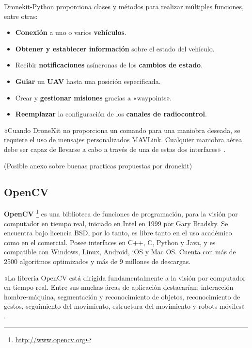 Dronekit-Python proporciona clases y métodos para realizar múltiples funciones, entre otras:
\begin{itemize}
\item \textbf{Conexión} a uno o varios \textbf{vehículos}.
\item \textbf{Obtener y establecer información} sobre el estado del vehículo.
\item Recibir \textbf{notificaciones} asíncronas de los \textbf{cambios de estado}.
\item \textbf{Guiar} un \textbf{\acs{UAV}} hasta una posición especificada.
\item Crear y \textbf{gestionar misiones} gracias a «waypoints».
\item \textbf{Reemplazar} la configuración de los \textbf{canales de radiocontrol}.
\end{itemize}

«Cuando DroneKit no proporciona un comando para una maniobra deseada, se requiere el uso de mensajes personalizados MAVLink.
Cualquier maniobra aérea debe ser capaz de llevarse a cabo a través de una de estas dos interfaces» \cite{dronekit}. 

(Posible anexo sobre buenas practicas propuestas por dronekit)

\subsection{OpenCV}
\label{sec:opencv}

\textbf{OpenCV} \footnote{\url{http://www.opencv.org}} es una biblioteca de funciones de programación, para la visión por computador 
en tiempo real, iniciado en Intel en 1999 por Gary Bradsky. Se encuentra bajo licencia BSD, por lo tanto, es libre tanto en el uso
académico como en el comercial. Posee interfaces en C++, C, Python y Java, y es compatible con Windows, Linux, Android, iOS y Mac OS.
Cuenta con más de 2500 algoritmos optimizados y más de 9 millones de descargas.

«La librería OpenCV está dirigida fundamentalmente a la visión por computador en tiempo real. Entre sus muchas áreas de 
aplicación destacarían: interacción hombre-máquina, segmentación y reconocimiento de objetos, reconocimiento de gestos, 
seguimiento del movimiento, estructura del movimiento y robots móviles» \cite{opencv}.

